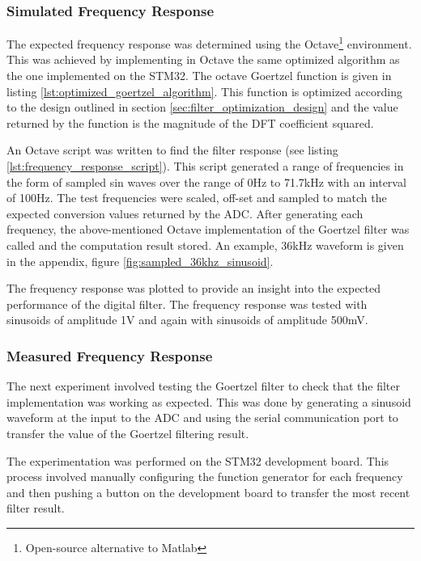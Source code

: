 \subsubsection{Simulated Frequency Response}
The expected frequency response was determined using the Octave\footnote{Open-source alternative to Matlab} environment. This was achieved by implementing in Octave the same optimized algorithm as the one implemented on the STM32.
The octave Goertzel function is given in listing \ref{lst:optimized_goertzel_algorithm}. This function is optimized according to the design outlined in section \ref{sec:filter_optimization_design} and the value returned by the function is the magnitude of the DFT coefficient squared.

An Octave script was written to find the filter response (see listing \ref{lst:frequency_response_script}). This script generated a range of frequencies in the form of sampled sin waves over the range of 0Hz to 71.7kHz with an interval of 100Hz. The test frequencies were scaled, off-set and sampled to match the expected conversion values returned by the ADC.
After generating each frequency, the above-mentioned Octave implementation of the Goertzel filter was called and the computation result stored. An example, 36kHz waveform is given in the appendix, figure \ref{fig:sampled_36khz_sinusoid}.

The frequency response was plotted to provide an insight into the expected performance of the digital filter. The frequency response was tested with sinusoids of amplitude 1V and again with sinusoids of amplitude 500mV.

\subsubsection{Measured Frequency Response}
The next experiment involved testing the Goertzel filter to check that the filter implementation was working as expected. This was done by generating a sinusoid waveform at the input to the ADC and using the serial communication port to transfer the value of the Goertzel filtering result. 

The experimentation was performed on the STM32 development board. This process involved manually configuring the function generator for each frequency and then pushing a button on the development board to transfer the most recent filter result.

